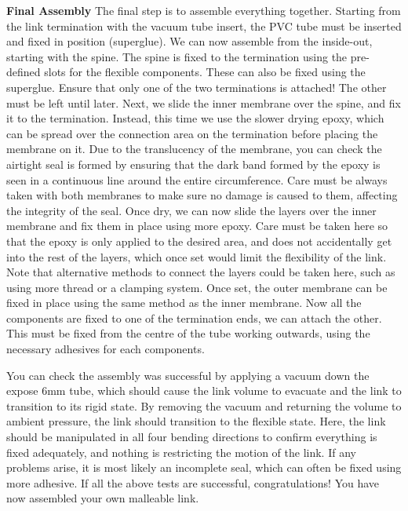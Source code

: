 \textbf{Final Assembly}
The final step is to assemble everything together. Starting from the link termination with the vacuum tube insert, the PVC tube must be inserted and fixed in position (superglue). We can now assemble from the inside-out, starting with the spine. The spine is fixed to the termination using the pre-defined slots for the flexible components. These can also be fixed using the superglue. Ensure that only one of the two terminations is attached! The other must be left until later. Next, we slide the inner membrane over the spine, and fix it to the termination. Instead, this time we use the slower drying epoxy, which can be spread over the connection area on the termination before placing the membrane on it. Due to the translucency of the membrane, you can check the airtight seal is formed by ensuring that the dark band formed by the epoxy is seen in a continuous line around the entire circumference. Care must be always taken with both membranes to make sure no damage is caused to them, affecting the integrity of the seal. Once dry, we can now slide the layers over the inner membrane and fix them in place using more epoxy. Care must be taken here so that the epoxy is only applied to the desired area, and does not accidentally get into the rest of the layers, which once set would limit the flexibility of the link. Note that alternative methods to connect the layers could be taken here, such as using more thread or a clamping system. Once set, the outer membrane can be fixed in place using the same method as the inner membrane. Now all the components are fixed to one of the termination ends, we can attach the other. This must be fixed from the centre of the tube working outwards, using the necessary adhesives for each components.

You can check the assembly was successful by applying a vacuum down the expose 6mm tube, which should cause the link volume to evacuate and the link to transition to its rigid state. By removing the vacuum and returning the volume to ambient pressure, the link should transition to the flexible state. Here, the link should be manipulated in all four bending directions to confirm everything is fixed adequately, and nothing is restricting the motion of the link. If any problems arise, it is most likely an incomplete seal, which can often be fixed using more adhesive. If all the above tests are successful, congratulations! You have now assembled your own malleable link.




